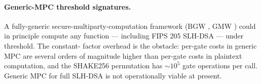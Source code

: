 \paragraph{Generic-MPC threshold signatures.} A fully-generic
secure-multiparty-computation framework (BGW \cite{bgw1988},
GMW \cite{gmw1987}) could in principle compute any function ---
including FIPS 205 SLH-DSA --- under threshold. The constant-
factor overhead is the obstacle: per-gate costs in generic MPC
are several orders of magnitude higher than per-gate costs in
plaintext computation, and the SHAKE256 permutation has
$\sim 10^5$ gate operations per call. Generic MPC for full
SLH-DSA is not operationally viable at present.
